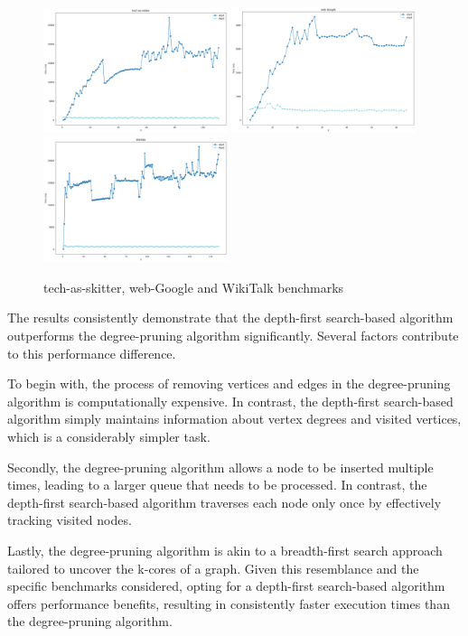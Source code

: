 \begin{figure}[H]
	\centering
	\includegraphics[width=0.48\textwidth]{Figures/tech-as-skitter.png} 
        \includegraphics[width=0.48\textwidth]{Figures/web-Google.png} 
        \includegraphics[width=0.48\textwidth]{Figures/WikiTalk.png} 
        \caption{tech-as-skitter, web-Google and WikiTalk benchmarks}
        \label{fig:skitter_google_wiki}
\end{figure}

The results consistently demonstrate that the depth-first search-based algorithm outperforms the degree-pruning algorithm significantly. Several factors contribute to this performance difference. 

To begin with, the process of removing vertices and edges in the degree-pruning algorithm is computationally expensive. In contrast, the depth-first search-based algorithm simply maintains information about vertex degrees and visited vertices, which is a considerably simpler task. 

Secondly, the degree-pruning algorithm allows a node to be inserted multiple times, leading to a larger queue that needs to be processed. In contrast, the depth-first search-based algorithm traverses each node only once by effectively tracking visited nodes.

Lastly, the degree-pruning algorithm is akin to a breadth-first search approach tailored to uncover the k-cores of a graph. Given this resemblance and the specific benchmarks considered, opting for a depth-first search-based algorithm offers performance benefits, resulting in consistently faster execution times than the degree-pruning algorithm.